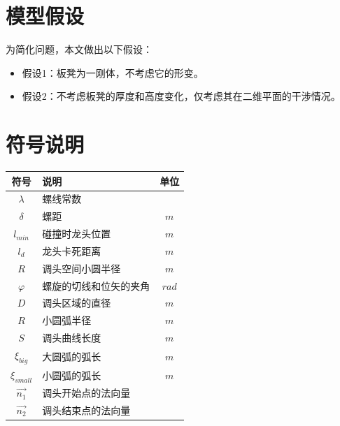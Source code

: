 \documentclass[withoutpreface,bwprint]{cumcmthesis}
\begin{document}

\section{模型假设}

为简化问题，本文做出以下假设：

\begin{itemize}[itemindent=2em]
\item 假设1：板凳为一刚体，不考虑它的形变。
\item 假设2：不考虑板凳的厚度和高度变化，仅考虑其在二维平面的干涉情况。

\end{itemize}


\section{符号说明}
\begin{table}[H]
\centering
\begin{tabularx}{\textwidth}{CLC}
\toprule
符号    & 说明    & 单位 \\
\midrule
$\lambda     $& 螺线常数 &  \\
$\delta     $& 螺距 & $m$ \\
$l_{min}     $& 碰撞时龙头位置 & $m$ \\
$l_d     $& 龙头卡死距离 & $m$ \\
$  R     $& 调头空间小圆半径 & $m$ \\
$\varphi     $& 螺旋的切线和位矢的夹角 & $rad$ \\
$D     $& 调头区域的直径 & $m$ \\
$R     $& 小圆弧半径 & $m$ \\
$S     $& 调头曲线长度 & $m$ \\
$\xi_{big}     $& 大圆弧的弧长 & $m$ \\
$\xi_{small}     $& 小圆弧的弧长 & $m$\\
$\overrightarrow{n_{1} }     $& 调头开始点的法向量 & $~$ \\
$\overrightarrow{n_{2} }    $& 调头结束点的法向量 & $~$ \\
\bottomrule
\end{tabularx}
\label{tab:符号说明}
\end{table}


\end{document}
